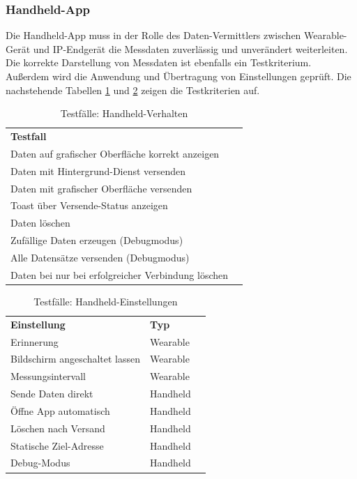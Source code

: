 \subsubsection{Handheld-App}
Die Handheld-App muss in der Rolle des Daten-Vermittlers zwischen Wearable-Gerät und IP-Endgerät die Messdaten zuverlässig und unverändert weiterleiten. Die korrekte Darstellung von Messdaten ist ebenfalls ein Testkriterium. Außerdem wird die Anwendung und Übertragung von Einstellungen geprüft. Die nachstehende Tabellen \ref{tbl:testcases_handheld_behavior} und \ref{tbl:testcases_handheld_settings} zeigen die Testkriterien auf.

\begin{table}[h]
	\centering
		\begin{tabularx}{\linewidth}{Xc}
			\textbf{Testfall}																		& \\
			Daten auf grafischer Oberfläche korrekt anzeigen		& \ok \\
			Daten mit Hintergrund-Dienst versenden							& \ok \\
			Daten mit grafischer Oberfläche versenden						& \ok \\
			Toast über Versende-Status anzeigen									& \ok \\
			Daten löschen			 																	& \ok \\
			Zufällige Daten erzeugen (Debugmodus)								& \ok \\
			Alle Datensätze versenden (Debugmodus)							& \ok \\
			Daten bei nur bei erfolgreicher Verbindung löschen	& \ok \\
		\end{tabularx}
		\caption{Testfälle: Handheld-Verhalten}
		\label{tbl:testcases_handheld_behavior}
\end{table}

\begin{table}[h]
	\centering
		\begin{tabularx}{\linewidth}{Xlc}
			\textbf{Einstellung}						& \textbf{Typ} 				& \\
			Erinnerung											& Wearable 						& \ok \\
			Bildschirm angeschaltet lassen 	& Wearable 						& \ok \\
			Messungsintervall 							& Wearable 						& \ok \\
			Sende Daten direkt 							& Handheld 						& \ok \\
			Öffne App automatisch						& Handheld 						& \ok \\
			Löschen nach Versand						& Handheld 						& \ok \\
			Statische Ziel-Adresse					& Handheld 						& \ok \\
			Debug-Modus							 				& Handheld 						& \ok \\
		\end{tabularx}
		\caption{Testfälle: Handheld-Einstellungen}
		\label{tbl:testcases_handheld_settings}
\end{table}



